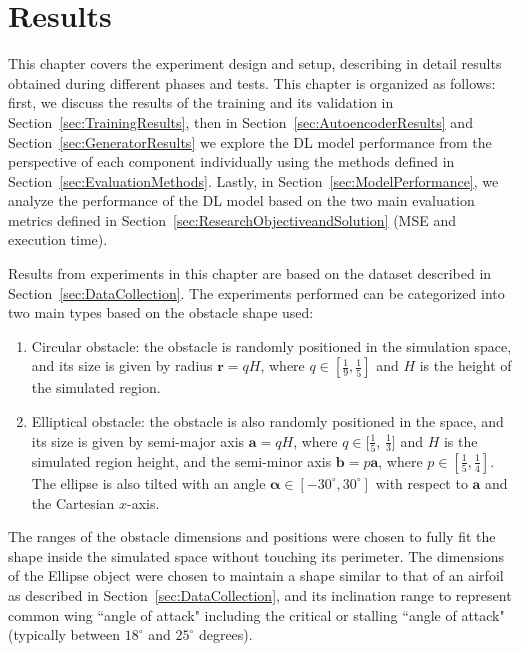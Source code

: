 
\chapter{Results}
\label{ch:Results}

This chapter covers the experiment design and setup, describing in detail results obtained during different phases and tests. This chapter is organized as follows: first, we discuss the results of the training and its validation in Section~\ref{sec:TrainingResults}, then in Section~\ref{sec:AutoencoderResults} and Section~\ref{sec:GeneratorResults} we explore the DL model performance from the perspective of each component individually using the methods defined in Section~\ref{sec:EvaluationMethods}.  Lastly, in Section~\ref{sec:ModelPerformance}, we analyze the performance of the DL model based on the two main evaluation metrics defined in Section~\ref{sec:ResearchObjectiveandSolution} (MSE and execution time).

Results from experiments in this chapter are based on the dataset described in Section~\ref{sec:DataCollection}. The experiments performed can be categorized into two main types based on the obstacle shape used:
\begin{enumerate}
    \item Circular obstacle: the obstacle is randomly positioned in the simulation space, and its size is given by radius $\textbf{r} = qH$, where $q \in [\frac{1}{9}, \frac{1}{5}]$ and $H$ is the height of the simulated region.
    
    \item Elliptical obstacle: the obstacle is also randomly positioned in the space, and its size is given by semi-major axis $\textbf{a}=qH$, where $q \in [\frac{1}{5}$, $\frac{1}{3}]$ and $H$ is the simulated region height, and the semi-minor axis $\textbf{b}=p\textbf{a}$, where $p \in [\frac{1}{5}, \frac{1}{4}]$. The ellipse is also tilted with an angle $\boldsymbol{\alpha} \in [-30^\circ, 30^\circ]$ with respect to $\textbf{a}$ and the Cartesian $x$-axis.
\end{enumerate}

The ranges of the obstacle dimensions and positions were chosen to fully fit the shape inside the simulated space without touching its perimeter. The dimensions of the Ellipse object were chosen to maintain a shape similar to that of an airfoil as described in Section~\ref{sec:DataCollection}, and its inclination range to represent common wing ``angle of attack" including the critical or stalling ``angle of attack" (typically between $18^\circ$ and $25^\circ$ degrees)\cite{abbott_ira_h_summary_1945}.


